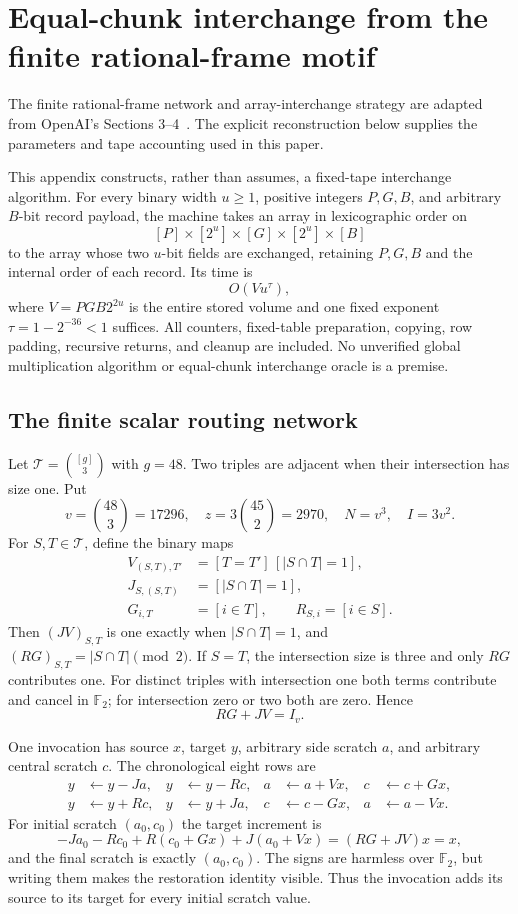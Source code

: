 \section{Equal-chunk interchange from the finite rational-frame motif}
\label{app:swap}

The finite rational-frame network and array-interchange strategy are
adapted from OpenAI's Sections 3--4~\cite{swap}. The explicit reconstruction
below supplies the parameters and tape accounting used in this paper.

This appendix constructs, rather than assumes, a fixed-tape interchange
algorithm.  For every binary width $u\ge1$, positive integers $P,G,B$,
and arbitrary $B$-bit record payload, the machine takes an array in
lexicographic order on
\[
 [P]\times[2^u]\times[G]\times[2^u]\times[B]
\]
to the array whose two $u$-bit fields are exchanged, retaining $P,G,B$
and the internal order of each record.  Its time is
\[
                        O(Vu^\tau),
\]
where $V=PGB2^{2u}$ is the entire stored volume and one fixed exponent
$\tau=1-2^{-36}<1$ suffices.  All counters, fixed-table preparation,
copying, row padding, recursive returns, and cleanup are included.  No
unverified global multiplication algorithm or equal-chunk interchange
oracle is a premise.

\subsection{The finite scalar routing network}

Let $\mathcal T=\binom{[g]}3$ with $g=48$.  Two triples are adjacent when
their intersection has size one.  Put
\[
 v=\binom{48}{3}=17296,\quad z=3\binom{45}{2}=2970,
 \quad N=v^3,\quad I=3v^2.
\]
For $S,T\in\mathcal T$, define the binary maps
\[
 \begin{aligned}
 V_{(S,T),T'}&=[T=T']\,[|S\cap T|=1],\\
 J_{S,(S,T)}&=[|S\cap T|=1],\\
 G_{i,T}&=[i\in T],\qquad R_{S,i}=[i\in S].
 \end{aligned}
\]
Then $(JV)_{S,T}$ is one exactly when $|S\cap T|=1$, and
$(RG)_{S,T}=|S\cap T|\pmod2$.  If $S=T$, the intersection size is
three and only $RG$ contributes one.  For distinct triples with
intersection one both terms contribute and cancel in $\mathbb F_2$;
for intersection zero or two both are zero.  Hence
\[
                              RG+JV=I_v.
\]

One invocation has source $x$, target $y$, arbitrary side scratch $a$,
and arbitrary central scratch $c$.  The chronological eight rows are
\[
\begin{aligned}
 y&\gets y-Ja,& y&\gets y-Rc,& a&\gets a+Vx,& c&\gets c+Gx,\\
 y&\gets y+Rc,& y&\gets y+Ja,& c&\gets c-Gx,& a&\gets a-Vx.
\end{aligned}
\]
For initial scratch $(a_0,c_0)$ the target increment is
\[
 -Ja_0-Rc_0+R(c_0+Gx)+J(a_0+Vx)=(RG+JV)x=x,
\]
and the final scratch is exactly $(a_0,c_0)$.  The signs are harmless
over $\mathbb F_2$, but writing them makes the restoration identity
visible.  Thus the invocation adds its source to its target for every
initial scratch value.

